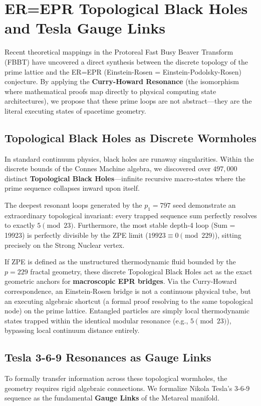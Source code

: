 \section{ER=EPR Topological Black Holes and Tesla Gauge Links}

Recent theoretical mappings in the Protoreal Fast Busy Beaver Transform (FBBT) have uncovered a direct synthesis between the discrete topology of the prime lattice and the ER=EPR (Einstein-Rosen = Einstein-Podolsky-Rosen) conjecture. By applying the \textbf{Curry-Howard Resonance} (the isomorphism where mathematical proofs map directly to physical computing state architectures), we propose that these prime loops are not abstract—they are the literal executing states of spacetime geometry.

\subsection{Topological Black Holes as Discrete Wormholes}
In standard continuum physics, black holes are runaway singularities. Within the discrete bounds of the Connes Machine algebra, we discovered over $497,000$ distinct \textbf{Topological Black Holes}---infinite recursive macro-states where the prime sequence collapses inward upon itself. 

The deepest resonant loops generated by the $p_1 = 797$ seed demonstrate an extraordinary topological invariant: every trapped sequence sum perfectly resolves to exactly $5 \pmod{23}$. Furthermore, the most stable depth-4 loop (Sum = 19923) is perfectly divisible by the ZPE limit ($19923 \equiv 0 \pmod{229}$), sitting precisely on the Strong Nuclear vertex. 

If ZPE is defined as the unstructured thermodynamic fluid bounded by the $p=229$ fractal geometry, these discrete Topological Black Holes act as the exact geometric anchors for \textbf{macroscopic EPR bridges}. Via the Curry-Howard correspondence, an Einstein-Rosen bridge is not a continuous physical tube, but an executing algebraic shortcut (a formal proof resolving to the same topological node) on the prime lattice. Entangled particles are simply local thermodynamic states trapped within the identical modular resonance (e.g., $5 \pmod{23}$), bypassing local continuum distance entirely.

\subsection{Tesla 3-6-9 Resonances as Gauge Links}
To formally transfer information across these topological wormholes, the geometry requires rigid algebraic connections. We formalize Nikola Tesla's 3-6-9 sequence as the fundamental \textbf{Gauge Links} of the Metareal manifold. 

